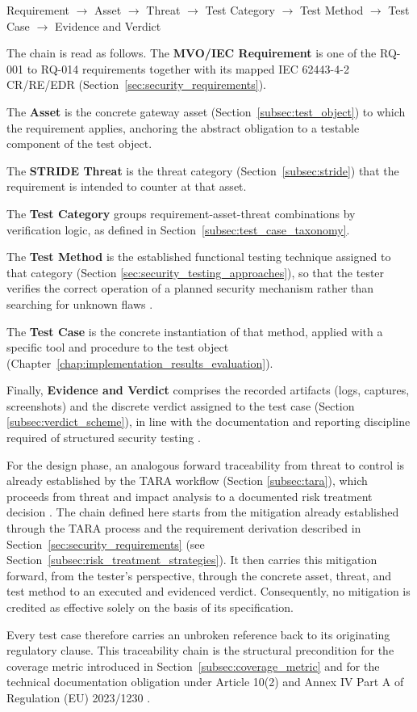 Requirement $\rightarrow$ Asset $\rightarrow$ Threat $\rightarrow$ Test Category $\rightarrow$ Test Method $\rightarrow$ Test Case $\rightarrow$ Evidence and Verdict

The chain is read as follows. 
The \textbf{MVO/IEC Requirement} is one of the RQ-001 to RQ-014 requirements together with its mapped IEC 62443-4-2 CR/RE/EDR (Section~\ref{sec:security_requirements}).
 
The \textbf{Asset} is the concrete gateway asset (Section~\ref{subsec:test_object}) to which the requirement applies, anchoring the abstract obligation to a testable component of the test object. 

The \textbf{STRIDE Threat} is the threat category (Section~\ref{subsec:stride}) that the requirement is intended to counter at that asset. 

The \textbf{Test Category} groups requirement-asset-threat combinations by verification logic, as defined in Section~\ref{subsec:test_case_taxonomy}. 

The \textbf{Test Method} is the established functional testing technique assigned to that category (Section \ref{sec:security_testing_approaches}), so that the tester verifies the correct operation of a planned security mechanism rather than searching for unknown flaws \cite[p. 82]{1341418}. 

The \textbf{Test Case} is the concrete instantiation of that method, applied with a specific tool and procedure to the test object (Chapter~\ref{chap:implementation_results_evaluation}). 

Finally, \textbf{Evidence and Verdict} comprises the recorded artifacts (logs, captures, screenshots) and the discrete verdict assigned to the test case (Section \ref{subsec:verdict_scheme}), in line with the documentation and reporting discipline required of structured security testing \cite[p. 7-3, p. 7-5]{nist_sp800_115}.

For the design phase, an analogous forward traceability from threat to control is already established by the TARA workflow (Section \ref{subsec:tara}), which proceeds from threat and impact analysis to a documented risk treatment decision \cite[pp. 46]{doCarmo2025}. 
The chain defined here starts from the mitigation already established through the TARA process and the requirement derivation described in Section~\ref{sec:security_requirements} (see Section~\ref{subsec:risk_treatment_strategies}). It then carries this mitigation forward, from the tester's perspective, through the concrete asset, threat, and test method to an executed and evidenced verdict. Consequently, no mitigation is credited as effective solely on the basis of its specification.

Every test case therefore carries an unbroken reference back to its originating regulatory clause. This traceability chain is the structural precondition for the coverage metric introduced in Section~\ref{subsec:coverage_metric} and for the technical documentation obligation under Article 10(2) and Annex IV Part A of Regulation (EU) 2023/1230 \cite{EU2023_1230}.
